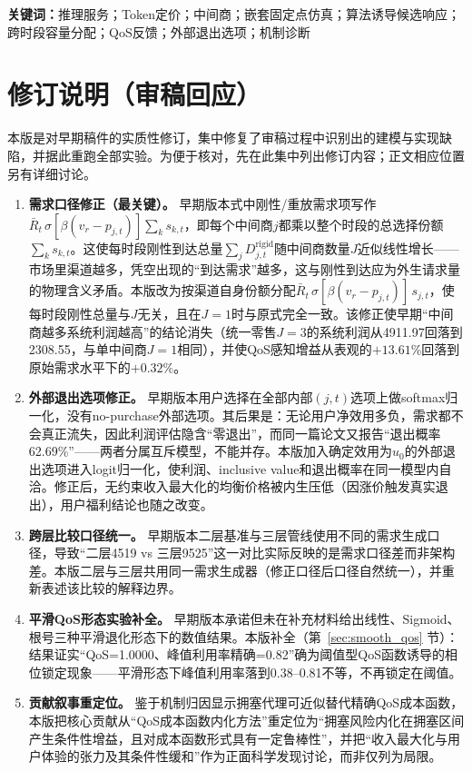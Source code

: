\documentclass[UTF8,11pt]{ctexart}
\newcommand{\D}{D}
\begin{document}
\noindent\textbf{关键词：}推理服务；Token定价；中间商；嵌套固定点仿真；算法诱导候选响应；跨时段容量分配；QoS反馈；外部退出选项；机制诊断

\section*{修订说明（审稿回应）}
\label{sec:revision_note}

本版是对早期稿件的实质性修订，集中修复了审稿过程中识别出的建模与实现缺陷，并据此重跑全部实验。为便于核对，先在此集中列出修订内容；正文相应位置另有详细讨论。

\begin{enumerate}[leftmargin=2em]
  \item \textbf{需求口径修正（最关键）。} 早期版本式中刚性/重放需求项写作$\bar R_t\,\sigma[\beta(v_r-p_{j,t})]\sum_{k}s_{k,t}$，即每个中间商$j$都乘以整个时段的总选择份额$\sum_k s_{k,t}$。这使每时段刚性到达总量$\sum_j \D^{\mathrm{rigid}}_{j,t}$随中间商数量$J$近似线性增长——市场里渠道越多，凭空出现的“到达需求”越多，这与刚性到达应为外生请求量的物理含义矛盾。本版改为按渠道自身份额分配$\bar R_t\,\sigma[\beta(v_r-p_{j,t})]\,s_{j,t}$，使每时段刚性总量与$J$无关，且在$J=1$时与原式完全一致。该修正使早期“中间商越多系统利润越高”的结论消失（统一零售$J{=}3$的系统利润从4911.97回落到2308.55，与单中间商$J{=}1$相同），并使QoS感知增益从表观的$+13.61\%$回落到原始需求水平下的$+0.32\%$。
  \item \textbf{外部退出选项修正。} 早期版本用户选择在全部内部$(j,t)$选项上做softmax归一化，没有no-purchase外部选项。其后果是：无论用户净效用多负，需求都不会真正流失，因此利润评估隐含“零退出”，而同一篇论文又报告“退出概率62.69\%”——两者分属互斥模型，不能并存。本版加入确定效用为$u_0$的外部退出选项进入logit归一化，使利润、inclusive value和退出概率在同一模型内自洽。修正后，无约束收入最大化的均衡价格被内生压低（因涨价触发真实退出），用户福利结论也随之改变。
  \item \textbf{跨层比较口径统一。} 早期版本二层基准与三层管线使用不同的需求生成口径，导致“二层4519 vs 三层9525”这一对比实际反映的是需求口径差而非架构差。本版二层与三层共用同一需求生成器（修正口径后口径自然统一），并重新表述该比较的解释边界。
  \item \textbf{平滑QoS形态实验补全。} 早期版本承诺但未在补充材料给出线性、Sigmoid、根号三种平滑退化形态下的数值结果。本版补全（第~\ref{sec:smooth_qos} 节）：结果证实“QoS=1.0000、峰值利用率精确=0.82”确为阈值型QoS函数诱导的相位锁定现象——平滑形态下峰值利用率落到0.38--0.81不等，不再锁定在阈值。
  \item \textbf{贡献叙事重定位。} 鉴于机制归因显示拥塞代理可近似替代精确QoS成本函数，本版把核心贡献从“QoS成本函数内化方法”重定位为“拥塞风险内化在拥塞区间产生条件性增益，且对成本函数形式具有一定鲁棒性”，并把“收入最大化与用户体验的张力及其条件性缓和”作为正面科学发现讨论，而非仅列为局限。
\end{enumerate}
\end{document}
